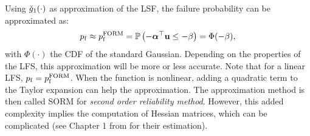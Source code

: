 Using $\check{g}_1(\cdot)$ as approximation of the LSF, the failure probability can be approximated as: 
\begin{equation}
    p_\mathrm{f} \approx p_\mathrm{f}^{\mathrm{FORM}} = \mathbb{P}\left(- {\boldsymbol{\alpha}}^\top {\bf u} \leq -\beta\right) = \Phi(-\beta),
\end{equation} 
with $\Phi(\cdot)$ the CDF of the standard Gaussian. 
Depending on the properties of the LFS, this approximation will be more or less accurate. 
Note that for a linear LFS, $p_\mathrm{f} = p_\mathrm{f}^{\mathrm{FORM}}$. 
When the function is nonlinear, adding a quadratic term to the Taylor expansion can help the approximation. 
The approximation method is then called SORM for \textit{second order reliability method}. 
However, this added complexity implies the computation of Hessian matrices, which can be complicated (see Chapter 1 from \citet{bourinet_2018} for their estimation).


